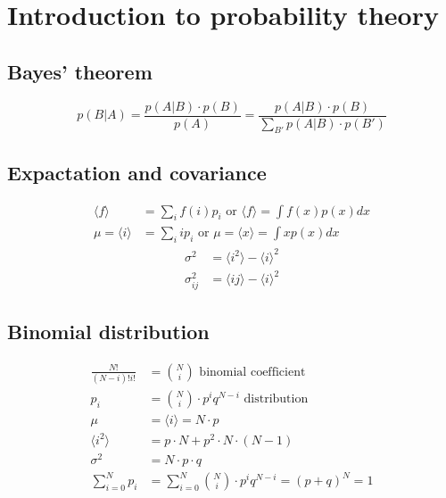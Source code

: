 \section{Introduction to probability theory}

\subsection*{Bayes' theorem}

\[
    p(B|A) = \frac{p(A|B) \cdot p(B)}{p(A)} = \frac{p(A|B) \cdot p(B)}{\sum_{B'}p(A|B) \cdot p(B')}
\]

\subsection*{Expactation and covariance}

\[
    \begin{aligned}
        \langle f \rangle &= \sum_i f(i)p_i \text{ or } \langle f \rangle = \int f(x) p(x) dx \\
        \mu = \langle i \rangle &= \sum_i i p_i \text{ or } \mu = \langle x \rangle = \int x p(x) dx
    \end{aligned}
\]
\[
    \begin{aligned}
        \sigma^2 &= \langle i^2 \rangle - \langle i \rangle^2 \\
        \sigma_{ij}^2 &= \langle ij \rangle - \langle i \rangle^2
    \end{aligned}
\]

\subsection*{Binomial distribution}

\[
    \begin{aligned}
        \frac{N!}{(N-i)!i!} &= {N \choose i} \text{  binomial coefficient} \\
        p_i &= {N \choose i} \cdot p^i q^{N-i} \text{  distribution} \\
        \mu &= \langle i \rangle = N \cdot p \\
        \langle i^2 \rangle &= p \cdot N + p^2 \cdot N \cdot (N-1) \\
        \sigma^2 &= N \cdot p \cdot q \\
        \sum_{i = 0}^N p_{i} &= \sum_{i = 0}^N {N \choose i} \cdot p^i q^{N-i} = \left(p + q\right)^N = 1
    \end{aligned}
\]

